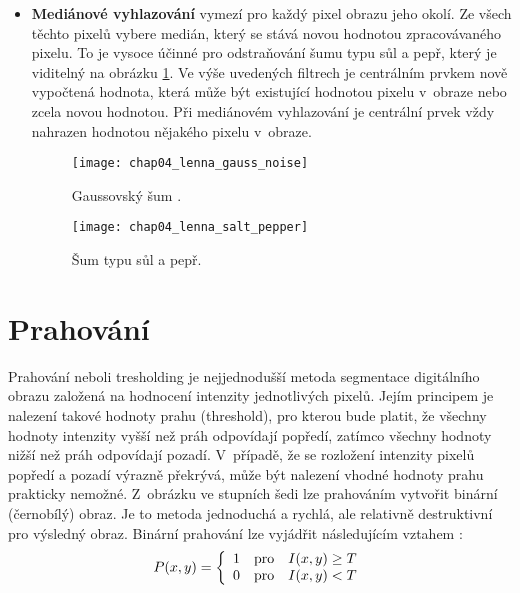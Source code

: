 \begin{itemize}
  \item \textbf{Mediánové vyhlazování} vymezí pro každý pixel obrazu jeho okolí. Ze všech těchto pixelů vybere medián, který se stává novou hodnotou zpracovávaného pixelu. To je vysoce účinné pro odstraňování šumu typu sůl a pepř, který je viditelný na obrázku \ref{pic:chap04_lenna_salt_pepper}. Ve výše uvedených filtrech je centrálním prvkem nově vypočtená hodnota, která může být existující hodnotou pixelu v~obraze nebo zcela novou hodnotou. Při mediánovém vyhlazování je centrální prvek vždy nahrazen hodnotou nějakého pixelu v~obraze.
  
  \begin{figure}[h]
    \begin{minipage}[c]{0.47\textwidth}
      \texttt{[image: chap04\_lenna\_gauss\_noise]}
      \caption{Gaussovský šum \cite{pic_lenna}.}
      \label{pic:chap04_lenna_gauss_noise}
    \end{minipage}
    \hfill
    \begin{minipage}[c]{0.47\textwidth}
      \texttt{[image: chap04\_lenna\_salt\_pepper]}
      \caption{Šum typu sůl a pepř.}
      \label{pic:chap04_lenna_salt_pepper}
    \end{minipage}
  \end{figure}

\end{itemize}

\section{Prahování}
Prahování neboli tresholding je nejjednodušší metoda segmentace digitálního obrazu založená na hodnocení intenzity jednotlivých pixelů. Jejím principem je nalezení takové hodnoty prahu (threshold), pro kterou bude platit, že všechny hodnoty intenzity vyšší než práh odpovídají popředí, zatímco všechny hodnoty nižší než práh odpovídají pozadí. V~případě, že se rozložení intenzity pixelů popředí a pozadí výrazně překrývá, může být nalezení vhodné hodnoty prahu prakticky nemožné. Z~obrázku ve stupních šedi lze prahováním vytvořit binární (černobílý) obraz. Je to metoda jednoduchá a rychlá, ale relativně destruktivní pro výsledný obraz. Binární prahování lze vyjádřit následujícím vztahem \cite{izg}:
\begin{equation}
  P(x,y) = \left\{
  \begin{array}{l l}
    1 & \text{pro} \quad I(x,y) \geq T\\
    0 & \text{pro} \quad I(x,y) < T
  \end{array} \right.
\end{equation}

